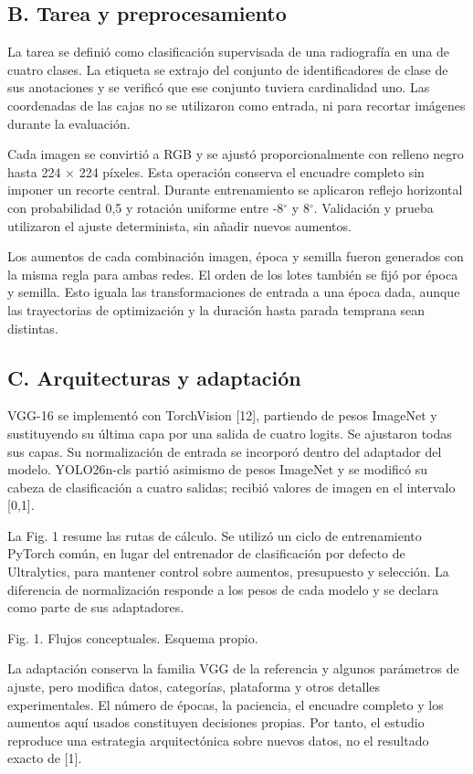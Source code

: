 \documentclass[conference]{IEEEtran}
\begin{document}
\newpage
\subsection*{B. Tarea y preprocesamiento}
La tarea se definió como clasificación supervisada de una radiografía en una de cuatro clases. La etiqueta se extrajo del conjunto de identificadores de clase de sus anotaciones y se verificó que ese conjunto tuviera cardinalidad uno. Las coordenadas de las cajas no se utilizaron como entrada, ni para recortar imágenes durante la evaluación.

Cada imagen se convirtió a RGB y se ajustó proporcionalmente con relleno negro hasta 224 $\times$ 224 píxeles. Esta operación conserva el encuadre completo sin imponer un recorte central. Durante entrenamiento se aplicaron reflejo horizontal con probabilidad 0,5 y rotación uniforme entre -8$^\circ$ y 8$^\circ$. Validación y prueba utilizaron el ajuste determinista, sin añadir nuevos aumentos.

Los aumentos de cada combinación imagen, época y semilla fueron generados con la misma regla para ambas redes. El orden de los lotes también se fijó por época y semilla. Esto iguala las transformaciones de entrada a una época dada, aunque las trayectorias de optimización y la duración hasta parada temprana sean distintas.

\subsection*{C. Arquitecturas y adaptación}
VGG-16 se implementó con TorchVision [12], partiendo de pesos ImageNet y sustituyendo su última capa por una salida de cuatro logits. Se ajustaron todas sus capas. Su normalización de entrada se incorporó dentro del adaptador del modelo. YOLO26n-cls partió asimismo de pesos ImageNet y se modificó su cabeza de clasificación a cuatro salidas; recibió valores de imagen en el intervalo [0,1].

La Fig. 1 resume las rutas de cálculo. Se utilizó un ciclo de entrenamiento PyTorch común, en lugar del entrenador de clasificación por defecto de Ultralytics, para mantener control sobre aumentos, presupuesto y selección. La diferencia de normalización responde a los pesos de cada modelo y se declara como parte de sus adaptadores.

\begin{center}\par\small Fig. 1. Flujos conceptuales. Esquema propio.\end{center}
La adaptación conserva la familia VGG de la referencia y algunos parámetros de ajuste, pero modifica datos, categorías, plataforma y otros detalles experimentales. El número de épocas, la paciencia, el encuadre completo y los aumentos aquí usados constituyen decisiones propias. Por tanto, el estudio reproduce una estrategia arquitectónica sobre nuevos datos, no el resultado exacto de [1].
\end{document}
